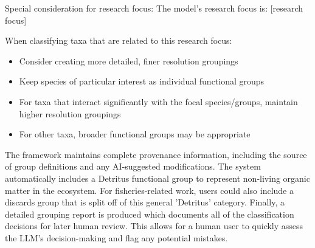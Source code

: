 \begin{prompt}
Special consideration for research focus:
The model's research focus is: [research focus]

When classifying taxa that are related to this research focus:
\begin{itemize}
\item Consider creating more detailed, finer resolution groupings
\item Keep species of particular interest as individual functional groups
\item For taxa that interact significantly with the focal species/groups, maintain higher resolution groupings
\item For other taxa, broader functional groups may be appropriate
\end{itemize}
\end{prompt}

The framework maintains complete provenance information, including the source of group definitions and any AI-suggested modifications. The system automatically includes a Detritus functional group to represent non-living organic matter in the ecosystem. For fisheries-related work, users could also include a discards group that is split off of this general 'Detritus' category. Finally, a detailed grouping report is produced which documents all of the classification decisions for later human review. This allows for a human user to quickly assess the LLM's decision-making and flag any potential mistakes.
